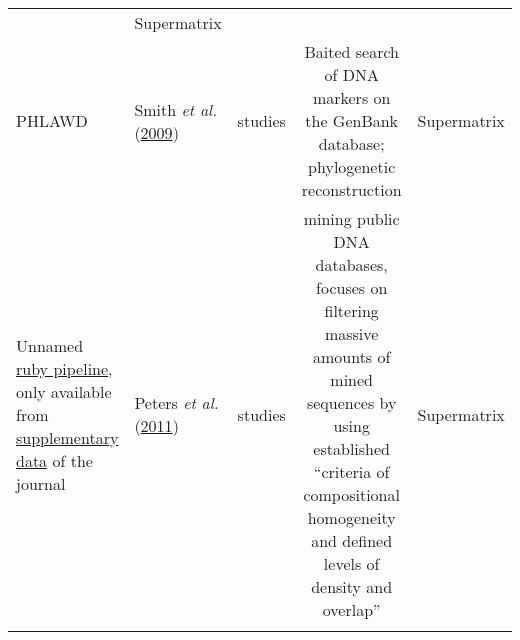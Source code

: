 \documentclass[]{article}
\begin{document}
\begin{longtable}[]{@{}llccc@{}}
\begin{minipage}[t]{0.20\columnwidth}
\end{minipage} & \begin{minipage}[t]{0.20\columnwidth}\centering
Supermatrix\strut
\end{minipage}\tabularnewline
\begin{minipage}[t]{0.12\columnwidth}\raggedright
PHLAWD\strut
\end{minipage} & \begin{minipage}[t]{0.15\columnwidth}\raggedright
Smith \emph{et al.} (\protect\hyperlink{ref-smith2009mega}{2009})\strut
\end{minipage} & \begin{minipage}[t]{0.20\columnwidth}\centering
234 studies\strut
\end{minipage} & \begin{minipage}[t]{0.20\columnwidth}\centering
Baited search of DNA markers on the GenBank database; phylogenetic reconstruction\strut
\end{minipage} & \begin{minipage}[t]{0.20\columnwidth}\centering
Supermatrix\strut
\end{minipage}\tabularnewline
\begin{minipage}[t]{0.12\columnwidth}\raggedright
Unnamed \href{https://www.zfmk.de/en/research/research-centres-and-groups/taming-of-an-impossible-child-pipeline-tools-and-manuals}{ruby pipeline}, only available from \href{https://static-content.springer.com/esm/art\%3A10.1186\%2F1741-7007-9-55/MediaObjects/12915_2011_480_MOESM1_ESM.ZIP}{supplementary data} of the journal\strut
\end{minipage} & \begin{minipage}[t]{0.15\columnwidth}\raggedright
Peters \emph{et al.} (\protect\hyperlink{ref-peters2011taming}{2011})\strut
\end{minipage} & \begin{minipage}[t]{0.20\columnwidth}\centering
64 studies\strut
\end{minipage} & \begin{minipage}[t]{0.20\columnwidth}\centering
mining public DNA databases, focuses on filtering massive amounts of mined sequences by using established ``criteria of compositional homogeneity and defined levels of density and overlap''\strut
\end{minipage} & \begin{minipage}[t]{0.20\columnwidth}\centering
Supermatrix\strut
\end{minipage}\tabularnewline
\begin{minipage}[t]{0.12\columnwidth}\raggedright

\end{minipage}
\end{longtable}
\end{document}
